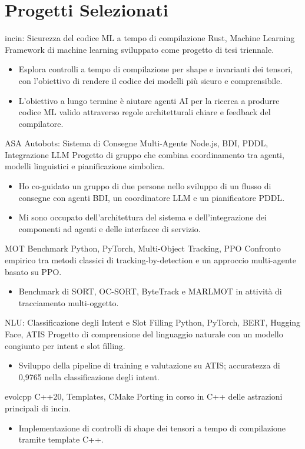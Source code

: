\section{Progetti Selezionati}

\cvproject
  {incin: Sicurezza del codice ML a tempo di compilazione}
  {Rust, Machine Learning}
  {Framework di machine learning sviluppato come progetto di tesi triennale.}
  {
    \begin{itemize}
      \item Esplora controlli a tempo di compilazione per shape e invarianti dei tensori, con l'obiettivo di rendere il codice dei modelli più sicuro e comprensibile.
      \item L'obiettivo a lungo termine è aiutare agenti AI per la ricerca a produrre codice ML valido attraverso regole architetturali chiare e feedback del compilatore.
    \end{itemize}
  }

\cvproject
  {ASA Autobots: Sistema di Consegne Multi-Agente}
  {Node.js, BDI, PDDL, Integrazione LLM}
  {Progetto di gruppo che combina coordinamento tra agenti, modelli linguistici e pianificazione simbolica.}
  {
    \begin{itemize}
      \item Ho co-guidato un gruppo di due persone nello sviluppo di un flusso di consegne con agenti BDI, un coordinatore LLM e un pianificatore PDDL.
      \item Mi sono occupato dell'architettura del sistema e dell'integrazione dei componenti ad agenti e delle interfacce di servizio.
    \end{itemize}
  }

\cvproject
  {MOT Benchmark}
  {Python, PyTorch, Multi-Object Tracking, PPO}
  {Confronto empirico tra metodi classici di tracking-by-detection e un approccio multi-agente basato su PPO.}
  {
    \begin{itemize}
      \item Benchmark di SORT, OC-SORT, ByteTrack e MARLMOT in attività di tracciamento multi-oggetto.
    \end{itemize}
  }

\cvproject
  {NLU: Classificazione degli Intent e Slot Filling}
  {Python, PyTorch, BERT, Hugging Face, ATIS}
  {Progetto di comprensione del linguaggio naturale con un modello congiunto per intent e slot filling.}
  {
    \begin{itemize}
      \item Sviluppo della pipeline di training e valutazione su ATIS; accuratezza di 0,9765 nella classificazione degli intent.
    \end{itemize}
  }

\cvproject
  {evolcpp}
  {C++20, Templates, CMake}
  {Porting in corso in C++ delle astrazioni principali di incin.}
  {
    \begin{itemize}
      \item Implementazione di controlli di shape dei tensori a tempo di compilazione tramite template C++.
    \end{itemize}
  }
